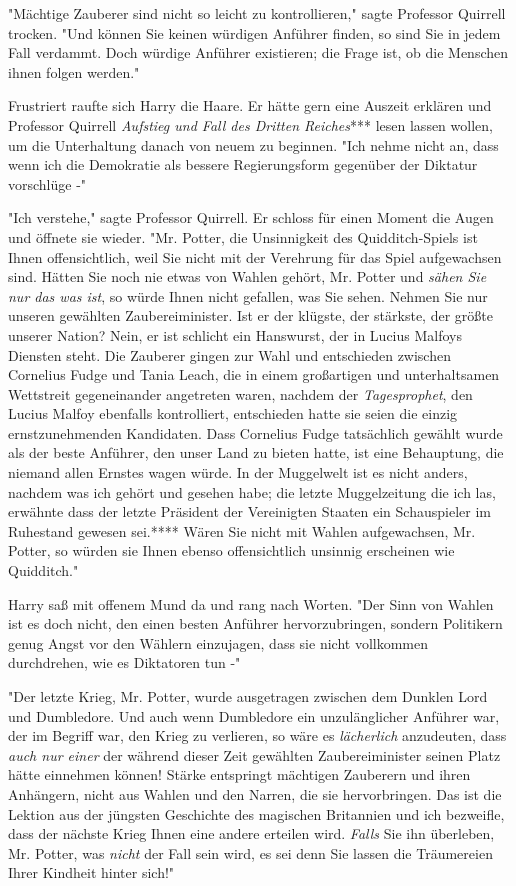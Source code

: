 {"Mächtige Zauberer sind nicht so leicht zu kontrollieren," sagte Professor Quirrell trocken. "Und können Sie keinen würdigen Anführer finden, so sind Sie in jedem Fall verdammt. Doch würdige Anführer existieren; die Frage ist, ob die Menschen ihnen folgen werden."

Frustriert raufte sich Harry die Haare. Er hätte gern eine Auszeit erklären und Professor Quirrell \emph{Aufstieg und Fall des Dritten Reiches}*** lesen lassen wollen, um die Unterhaltung danach von neuem zu beginnen. "Ich nehme nicht an, dass wenn ich die Demokratie als bessere Regierungsform gegenüber der Diktatur vorschlüge -"

"Ich verstehe," sagte Professor Quirrell. Er schloss für einen Moment die Augen und öffnete sie wieder. "Mr. Potter, die Unsinnigkeit des Quidditch-Spiels ist Ihnen offensichtlich, weil Sie nicht mit der Verehrung für das Spiel aufgewachsen sind. Hätten Sie noch nie etwas von Wahlen gehört, Mr. Potter und \emph{sähen Sie nur das was ist}, so würde Ihnen nicht gefallen, was Sie sehen. Nehmen Sie nur unseren gewählten Zaubereiminister. Ist er der klügste, der stärkste, der größte unserer Nation? Nein, er ist schlicht ein Hanswurst, der in Lucius Malfoys Diensten steht. Die Zauberer gingen zur Wahl und entschieden zwischen Cornelius Fudge und Tania Leach, die in einem großartigen und unterhaltsamen Wettstreit gegeneinander angetreten waren, nachdem der \emph{Tagesprophet}, den Lucius Malfoy ebenfalls kontrolliert, entschieden hatte sie seien die einzig ernstzunehmenden Kandidaten. Dass Cornelius Fudge tatsächlich gewählt wurde als der beste Anführer, den unser Land zu bieten hatte, ist eine Behauptung, die niemand allen Ernstes wagen würde. In der Muggelwelt ist es nicht anders, nachdem was ich gehört und gesehen habe; die letzte Muggelzeitung die ich las, erwähnte dass der letzte Präsident der Vereinigten Staaten ein Schauspieler im Ruhestand gewesen sei.**** Wären Sie nicht mit Wahlen aufgewachsen, Mr. Potter, so würden sie Ihnen ebenso offensichtlich unsinnig erscheinen wie Quidditch."

Harry saß mit offenem Mund da und rang nach Worten. "Der Sinn von Wahlen ist es doch nicht, den einen besten Anführer hervorzubringen, sondern Politikern genug Angst vor den Wählern einzujagen, dass sie nicht vollkommen durchdrehen, wie es Diktatoren tun -"

"Der letzte Krieg, Mr. Potter, wurde ausgetragen zwischen dem Dunklen Lord und Dumbledore. Und auch wenn Dumbledore ein unzulänglicher Anführer war, der im Begriff war, den Krieg zu verlieren, so wäre es \emph{lächerlich} anzudeuten, dass \emph{auch nur einer} der während dieser Zeit gewählten Zaubereiminister seinen Platz hätte einnehmen können! Stärke entspringt mächtigen Zauberern und ihren Anhängern, nicht aus Wahlen und den Narren, die sie hervorbringen. Das ist die Lektion aus der jüngsten Geschichte des magischen Britannien und ich bezweifle, dass der nächste Krieg Ihnen eine andere erteilen wird. \emph{Falls} Sie ihn überleben, Mr. Potter, was \emph{nicht} der Fall sein wird, es sei denn Sie lassen die Träumereien Ihrer Kindheit hinter sich!"

}
